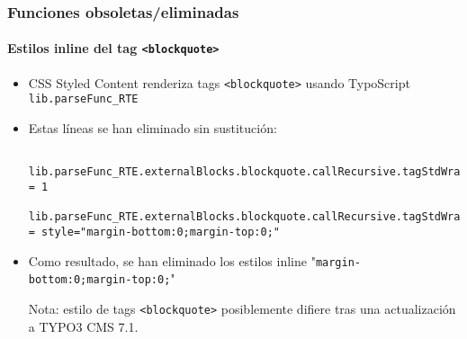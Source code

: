 
\begin{frame}[fragile]
	\frametitle{Funciones obsoletas/eliminadas}
	\framesubtitle{Estilos inline del tag \texttt{<blockquote>}}

	\lstset{basicstyle=\tiny\ttfamily}

	\begin{itemize}

		\item CSS Styled Content renderiza tags \texttt{<blockquote>} usando TypoScript \texttt{lib.parseFunc\_RTE}
		\item Estas líneas se han eliminado sin sustitución:

			\begin{lstlisting}
				lib.parseFunc_RTE.externalBlocks.blockquote.callRecursive.tagStdWrap.HTMLparser = 1
				lib.parseFunc_RTE.externalBlocks.blockquote.callRecursive.tagStdWrap.HTMLparser.tags.blockquote.overrideAttribs = style="margin-bottom:0;margin-top:0;"
			\end{lstlisting}

		\item Como resultado, se han eliminado los estilos inline "\texttt{margin-bottom:0;margin-top:0;}"\newline

			\vspace{0.2cm}

			\begingroup
				\color{red}
					Nota: estilo de tags \texttt{<blockquote>} posiblemente difiere tras una
					actualización a TYPO3 CMS 7.1.
			\endgroup

	\end{itemize}

\end{frame}


